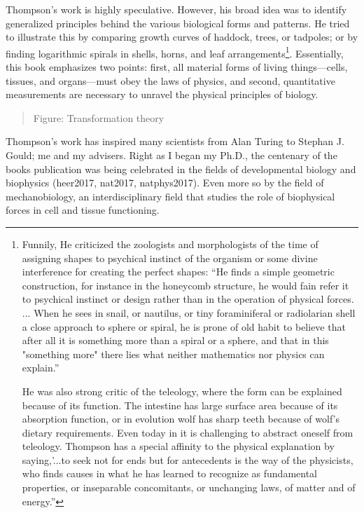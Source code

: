 \documentclass[
]{article}
\begin{document}
Thompson's work is highly speculative. However, his broad idea was to
identify generalized principles behind the various biological forms and
patterns. He tried to illustrate this by comparing growth curves of
haddock, trees, or tadpoles; or by finding logarithmic spirals in
shells, horns, and leaf arrangements\footnote{Funnily, He criticized the
  zoologists and morphologists of the time of assigning shapes to
  psychical instinct of the organism or some divine interference for
  creating the perfect shapes: ``He finds a simple geometric
  construction, for instance in the honeycomb structure, he would fain
  refer it to psychical instinct or design rather than in the operation
  of physical forces. ... When he sees in snail, or nautilus, or tiny
  foraminiferal or radiolarian shell a close approach to sphere or
  spiral, he is prone of old habit to believe that after all it is
  something more than a spiral or a sphere, and that in this "something
  more" there lies what neither mathematics nor physics can explain.''

  He was also strong critic of the teleology, where the form can be
  explained because of its function. The intestine has large surface
  area because of its absorption function, or in evolution wolf has
  sharp teeth because of wolf's dietary requirements. Even today in it
  is challenging to abstract oneself from teleology. Thompson has a
  special affinity to the physical explanation by saying,'...to seek not
  for ends but for antecedents is the way of the physicists, who finds
  causes in what he has learned to recognize as fundamental properties,
  or inseparable concomitants, or unchanging laws, of matter and of
  energy.''}. Essentially, this book emphasizes two points: first, all
material forms of living things---cells, tissues, and organs---must obey
the laws of physics, and second, quantitative measurements are necessary
to unravel the physical principles of biology.

\begin{quote}
Figure: Transformation theory
\end{quote}

Thompson's work has inspired many scientists from Alan Turing to Stephan
J. Gould; me and my advisers. Right as I began my Ph.D., the centenary
of the book\textquotesingle s publication was being celebrated in the
fields of developmental biology and biophysics (heer2017, nat2017,
natphys2017). Even more so by the field of mechanobiology, an
interdisciplinary field that studies the role of biophysical forces in
cell and tissue functioning.
\end{document}
